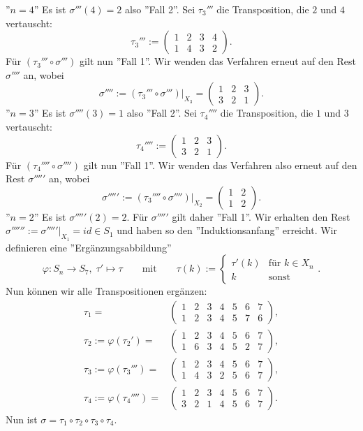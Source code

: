 \documentclass{article}
\begin{document}
''$n=4$''
Es ist
$\sigma'''(4) = 2$
also ''Fall 2''.
Sei
$\tau_3'''$
die Transposition,
die $2$ und $4$ vertauscht:
\[
\tau_3''' := \begin{pmatrix}
  1 & 2 & 3 & 4 \\
  1 & 4 & 3 & 2
  \end{pmatrix}.
\]
Für
$(\tau_3''' \circ \sigma''')$
gilt nun ''Fall 1''.
Wir wenden das Verfahren erneut auf den Rest
$\sigma''''$ an, wobei
\[
  \sigma'''' := (\tau_3''' \circ \sigma''')|_{X_3} = \begin{pmatrix}
  1 & 2 & 3 \\
  3 & 2 & 1
  \end{pmatrix}.
\]
''$n=3$''
Es ist
$\sigma''''(3) = 1$
also ''Fall 2''.
Sei
$\tau_4''''$
die Transposition,
die $1$ und $3$ vertauscht:
\[
\tau_4'''' := \begin{pmatrix}
  1 & 2 & 3  \\
  3 & 2 & 1 
  \end{pmatrix}.
\]
Für
$(\tau_4'''' \circ \sigma'''')$
gilt nun ''Fall 1''.
Wir wenden das Verfahren also erneut auf den Rest
$\sigma'''''$ an, wobei
\[
  \sigma''''' := (\tau_3'''' \circ \sigma'''')|_{X_2} = \begin{pmatrix}
  1 & 2 \\
  1 & 2 
  \end{pmatrix}.
\]
''$n=2$'' Es ist
$\sigma'''''(2) = 2$.
Für 
$\sigma'''''$
gilt daher ''Fall 1''.
Wir erhalten den Rest
$\sigma'''''' := \sigma'''''|_{X_1} = id \in S_1$
und haben so den ''Induktionsanfang'' erreicht.
\newpage
Wir definieren eine ''Ergänzungsabbildung''
\[
\varphi : S_n \to S_7, \; \tau' \mapsto \tau
\qquad \text{mit} \qquad
\tau(k) :=
\begin{cases*}
  \tau'(k) & \text{für $k \in X_n$}\\
  k & \text{sonst}
\end{cases*}.
\]
Nun können wir alle Transpositionen ergänzen:
\begin{align*}
  \tau_1 = &\begin{pmatrix}
    1 & 2 & 3 & 4 & 5 & 6 & 7 \\
    1 & 2 & 3 & 4 & 5 & 7 & 6
    \end{pmatrix}, \\
  \tau_2 := \varphi(\tau_2') = &\begin{pmatrix}
    1 & 2 & 3 & 4 & 5 & 6 & 7\\
    1 & 6 & 3 & 4 & 5 & 2 & 7
    \end{pmatrix}, \\
  \tau_3 := \varphi(\tau_3''') = &\begin{pmatrix}
    1 & 2 & 3 & 4 & 5 & 6 & 7\\
    1 & 4 & 3 & 2 & 5 & 6 & 7
    \end{pmatrix}, \\
    \tau_4 := \varphi(\tau_4'''') = &\begin{pmatrix}
      1 & 2 & 3 & 4 & 5 & 6 & 7\\
      3 & 2 & 1 & 4 & 5 & 6 & 7
      \end{pmatrix}.
\end{align*}
Nun ist $\sigma = \tau_1 \circ \tau_2 \circ \tau_3 \circ \tau_4$.
\end{document}
